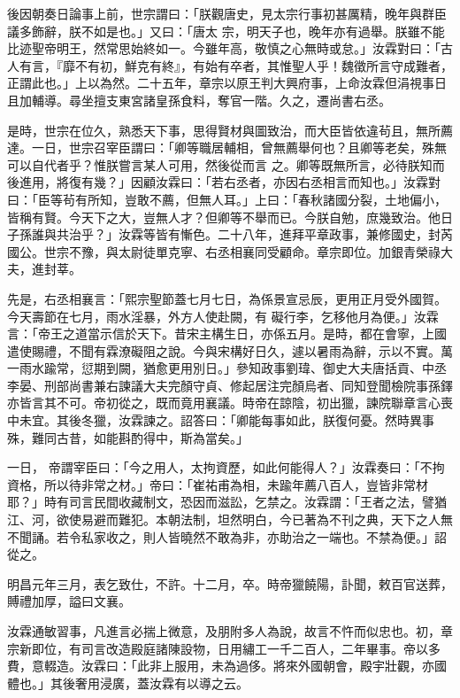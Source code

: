 \begin{pinyinscope}
 後因朝奏日論事上前，世宗謂曰：「朕觀唐史，見太宗行事初甚厲精，晚年與群臣議多飾辭，朕不如是也。」又曰：「唐太
 宗，明天子也，晚年亦有過舉。朕雖不能比迹聖帝明王，然常思始終如一。今雖年高，敬慎之心無時或怠。」汝霖對曰：「古人有言，『靡不有初，鮮克有終』，有始有卒者，其惟聖人乎！魏徵所言守成難者，正謂此也。」上以為然。二十五年，章宗以原王判大興府事，上命汝霖但涓視事日且加輔導。尋坐擅支東宮諸皇孫食料，奪官一階。久之，遷尚書右丞。



 是時，世宗在位久，熟悉天下事，思得賢材與圖致治，而大臣皆依違茍且，無所薦達。一日，世宗召宰臣謂曰：「卿等職居輔相，曾無薦舉何也？且卿等老矣，殊無可以自代者乎？惟朕嘗言某人可用，然後從而言
 之。卿等既無所言，必待朕知而後進用，將復有幾？」因顧汝霖曰：「若右丞者，亦因右丞相言而知也。」汝霖對曰：「臣等茍有所知，豈敢不薦，但無人耳。」上曰：「春秋諸國分裂，土地偏小，皆稱有賢。今天下之大，豈無人才？但卿等不舉而已。今朕自勉，庶幾致治。他日子孫誰與共治乎？」汝霖等皆有慚色。二十八年，進拜平章政事，兼修國史，封芮國公。世宗不豫，與太尉徒單克寧、右丞相襄同受顧命。章宗即位。加銀青榮祿大夫，進封莘。



 先是，右丞相襄言：「熙宗聖節蓋七月七日，為係景宣忌辰，更用正月受外國賀。今天壽節在七月，雨水淫暴，外方人使赴闕，有
 礙行李，乞移他月為便。」汝霖言：「帝王之道當示信於天下。昔宋主構生日，亦係五月。是時，都在會寧，上國遣使賜禮，不聞有霖潦礙阻之說。今與宋構好日久，遽以暑雨為辭，示以不實。萬一雨水踰常，愆期到闕，猶愈更用別日。」參知政事劉瑋、御史大夫唐括貢、中丞李晏、刑部尚書兼右諫議大夫完顏守貞、修起居注完顏烏者、同知登聞檢院事孫鐸亦皆言其不可。帝初從之，既而竟用襄議。時帝在諒陰，初出獵，諫院聯章言心喪中未宜。其後冬獵，汝霖諫之。詔答曰：「卿能每事如此，朕復何憂。然時異事殊，難同古昔，如能斟酌得中，斯為當矣。」



 一日，
 帝謂宰臣曰：「今之用人，太拘資歷，如此何能得人？」汝霖奏曰：「不拘資格，所以待非常之材。」帝曰：「崔祐甫為相，未踰年薦八百人，豈皆非常材耶？」時有司言民間收藏制文，恐因而滋訟，乞禁之。汝霖謂：「王者之法，譬猶江、河，欲使易避而難犯。本朝法制，坦然明白，今已著為不刊之典，天下之人無不聞誦。若令私家收之，則人皆曉然不敢為非，亦助治之一端也。不禁為便。」詔從之。



 明昌元年三月，表乞致仕，不許。十二月，卒。時帝獵饒陽，訃聞，敕百官送葬，賻禮加厚，謚曰文襄。



 汝霖通敏習事，凡進言必揣上微意，及朋附多人為說，故言不忤而似忠也。初，章
 宗新即位，有司言改造殿庭諸陳設物，日用繡工一千二百人，二年畢事。帝以多費，意輟造。汝霖曰：「此非上服用，未為過侈。將來外國朝會，殿宇壯觀，亦國體也。」其後奢用浸廣，蓋汝霖有以導之云。




\end{pinyinscope}
